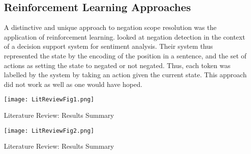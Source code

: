\documentclass[10pt, a4paper]{article}
\begin{document}
\subsection{Reinforcement Learning Approaches}
A distinctive and unique approach to negation scope resolution was the application of reinforcement learning.  looked at negation detection in the context of a decision support system for sentiment analysis. Their system thus represented the state by the encoding of the position in a sentence, and the set of actions as setting the state to negated or not negated. Thus, each token was labelled by the system by taking an action given the current state. This approach did not work as well as one would have hoped.

\begin{table}
    \centering
    \texttt{[image: LitReviewFig1.png]}
    \caption{Literature Review: Results Summary}
    \label{fig:litreviewfig1}
\end{table}

\begin{table}
    \centering
    \texttt{[image: LitReviewFig2.png]}
    \caption{Literature Review: Results Summary}
    \label{fig:litreviewfig2}
\end{table}
\end{document}
